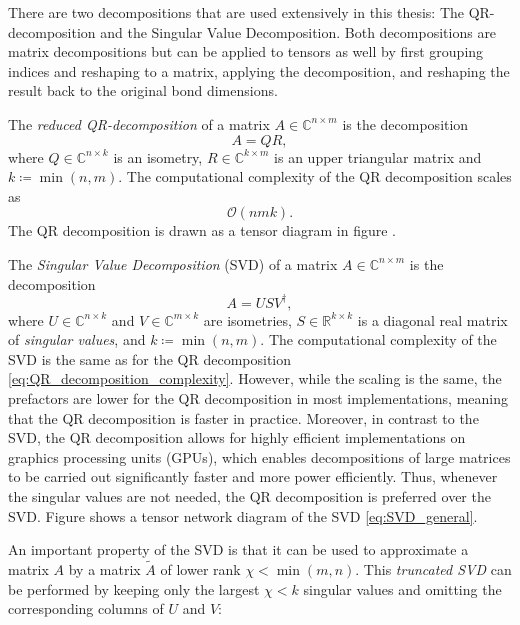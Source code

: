 There are two decompositions that are used extensively in this thesis: The QR-decomposition and the Singular Value Decomposition. Both decompositions are matrix decompositions but can be applied to tensors as well by first grouping indices and reshaping to a matrix, applying the decomposition, and reshaping the result back to the original bond dimensions. \par
The \textit{reduced QR-decomposition} of a matrix $A \in \mathbb{C}^{n\times m}$ is the decomposition
\begin{equation}
	\label{eq:QR_decomposition_general}
	A = QR,
\end{equation}
where $Q\in\mathbb{C}^{n\times k}$ is an isometry, $R\in\mathbb{C}^{k\times m}$ is an upper triangular matrix and $k \coloneqq \min(n, m)$. The computational complexity of the QR decomposition scales as
\begin{equation}
	\label{eq:QR_decomposition_complexity}
	\mathcal{O}\left(nmk\right).
\end{equation}
The QR decomposition is drawn as a tensor diagram in figure . \par
The \textit{Singular Value Decomposition} (SVD) of a matrix $A \in \mathbb{C}^{n\times m}$ is the decomposition
\begin{equation}
	\label{eq:SVD_general}
	A = USV^\dagger,
\end{equation}
where $U\in\mathbb{C}^{n\times k}$ and $V\in\mathbb{C}^{m\times k}$ are isometries, $S\in\mathbb{R}^{k\times k}$ is a diagonal real matrix of \textit{singular values}, and $k \coloneqq \min(n, m)$. The computational complexity of the SVD is the same as for the QR decomposition \eqref{eq:QR_decomposition_complexity}. However, while the scaling is the same, the prefactors are lower for the QR decomposition in most implementations, meaning that the QR decomposition is faster in practice. Moreover, in contrast to the SVD, the QR decomposition allows for highly efficient implementations on graphics processing units (GPUs), which enables decompositions of large matrices to be carried out significantly faster and more power efficiently. Thus, whenever the singular values are not needed, the QR decomposition is preferred over the SVD. Figure  shows a tensor network diagram of the SVD \eqref{eq:SVD_general}. \par
An important property of the SVD is that it can be used to approximate a matrix $A$ by a matrix $\tilde{A}$ of lower rank $\chi < \min(m, n)$. This \textit{truncated SVD} can be performed by keeping only the largest $\chi < k$ singular values and omitting the corresponding columns of $U$ and $V$:
